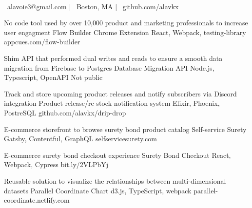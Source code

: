 \documentclass[]{awesome-cv}
\begin{document}
    
\begin{center}
	  \\
	\vspace{2mm}
	{\faEnvelope\ alavoie3@gmail.com} | {\faMapMarker\ Boston, MA} | {\faLink\ github.com/alavkx}
\end{center}

\begin{cventries}
	\cventry
	{No code tool used by over 10,000 product and marketing professionals to increase user engagment}
	{Flow Builder Chrome Extension}
	{React, Webpack, testing-library}
	{appcues.com/flow-builder}
	{}
	
	\vspace{-5mm}
	\cventry
	{Shim API that performed dual writes and reads to ensure a smooth data migration from Firebase to Postgres}
	{Database Migration API}
	{Node.js, Typescript, OpenAPI}
	{Not public}
	{}
	
	\vspace{-5mm}
	\cventry
	{Track and store upcoming product releases and notify subscribers via Discord integration}
	{Product release/re-stock notification system}
	{Elixir, Phoenix, PostreSQL}
	{github.com/alavkx/drip-drop}
	{}
	
	\vspace{-5mm}
	\cventry
	{E-commerce storefront to browse surety bond product catalog}
	{Self-service Surety}
	{Gatsby, Contentful, GraphQL}
	{selfservicesurety.com}
	{}
	
	\vspace{-5mm}
	\cventry
	{E-commerce surety bond checkout experience}
	{Surety Bond Checkout}
	{React, Webpack, Cypress}
	{bit.ly/2VLPbYj}
	{}

	\vspace{-5mm}
	\cventry
	{Reusable solution to visualize the relationships between multi-dimensional datasets}
	{Parallel Coordinate Chart}
	{d3.js, TypeScript, webpack}
	{parallel-coordinate.netlify.com}
	{}
	
	\vspace{-5mm}
\end{cventries}
\end{document}
